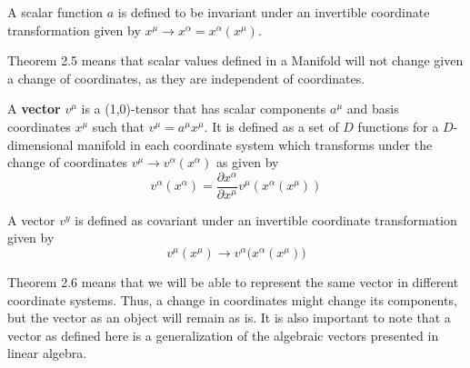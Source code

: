 \documentclass{article}
\begin{document}
 	\pagebreak
 		\begin{thm}
 			A scalar function $a$ is defined to be invariant under an invertible coordinate transformation given by $x^\mu \to x^\alpha = x^\alpha (x^\mu)$.
 		\end{thm} \noindent
 		Theorem 2.5 means that scalar values defined in a Manifold will not change given a change of coordinates, as they are independent of coordinates.
 		\begin{defn}
 			A \textbf{vector} $v^\mu$ is a (1,0)-tensor that has scalar components $a^\mu$ and basis coordinates $x^\mu$ such that $v^\mu= a^\mu x^\mu$. It is defined as a set of $D$ functions for a $D$-dimensional manifold in each coordinate system which transforms under the change of coordinates $v^\mu \to v^\alpha (x^\alpha)$ as given by
 			$$v^\alpha (x^\alpha) = \frac{\partial x^\alpha}{\partial x^\mu} v^\mu \left( x^\alpha (x^\mu) \right) $$
 		\end{defn}
 		\begin{thm}
 			A vector $v^y$ is defined as covariant under an invertible coordinate transformation given by $$v^\mu(x^\mu) \to v^\alpha \big(x^\alpha (x^\mu)\big) $$
 		\end{thm} \noindent
 		Theorem 2.6 means that we will be able to represent the same vector in different coordinate systems. Thus, a change in coordinates might change its components, but the vector as an object will remain as is. It is also important to note that a vector as defined here is a generalization of the algebraic vectors presented in linear algebra. 
 		
\end{document}
